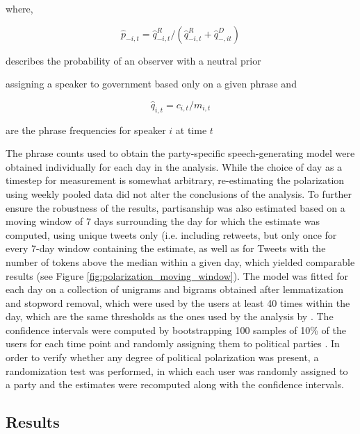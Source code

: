 \documentclass{article}
\begin{document}
	\centerline{where, }
	
	\begin{equation}
			\hat{p}_{-i,t} = \hat{q}_{-i,t}^{R} / (\hat{q}_{-i,t}^{R} + \hat{q}_{-,it}^{D})
	\end{equation}
	
	\centerline{describes the probability of an observer with a neutral prior}
	\centerline{assigning a speaker to government based only on a given phrase and}
	
	\begin{equation}
		\hat{q}_{i,t} = c_{i,t} / m_{i,t}
	\end{equation}
	 \centerline{are the phrase frequencies for speaker $i$ at time $t$}
	 
	 \bigskip
	
	The phrase counts used to obtain the party-specific speech-generating model were obtained individually for each day in the analysis. While the choice of day as a timestep for measurement is somewhat arbitrary, re-estimating the polarization using weekly pooled data did not alter the conclusions of the analysis. To further ensure the robustness of the results, partisanship was also estimated based on a moving window of 7 days surrounding the day for which the estimate was computed, using unique tweets only (i.e. including retweets, but only once for every 7-day window containing the estimate, as well as for Tweets with the number of tokens above the median within a given day, which yielded comparable results (see Figure \ref{fig:polarization_moving_window}). The model was fitted for each day on a collection of unigrams and bigrams obtained after lemmatization and stopword removal, which were used by the users at least 40 times within the day, which are the same thresholds as the ones used by the analysis by \citet{demszky2019}. The confidence intervals were computed by bootstrapping 100 samples of 10\% of the users for each time point and randomly assigning them to political parties \citep{politis2001, gentzkow2019}. In order to verify whether any degree of political polarization was present, a randomization test was performed, in which each user was randomly assigned to a party and the estimates were recomputed along with the confidence intervals.
	
	\clearpage
	
	\subsection*{Results}
	
\end{document}
